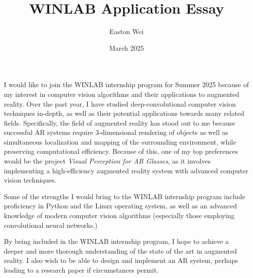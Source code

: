 \documentclass[11pt]{scrartcl}
\begin{document}
\title{WINLAB Application Essay}
\author{Easton Wei}
\date{March 2025}
\maketitle
I would like to join the WINLAB internship program for Summer 2025
because of my interest in computer vision algorithms and their
applications to augmented reality. Over the past year, I
have studied deep-convolutional computer vision techniques in-depth,
as well as their potential applications towards many related fields.
Specifically, the field of augmented reality has stood out to me
because successful AR systems require 3-dimensional rendering of objects
as well as simultaneous localization and mapping of the surrounding environment,
while preserving computational efficiency.
Because of this, one of my top preferences would be the project
\textit{Visual Perception for AR Glasses}, as it involves implementing
a high-efficiency augmented reality system with advanced
computer vision techniques.

Some of the strengths I would bring to the WINLAB internship program
include proficiency in Python and the Linux operating system,
as well as an advanced knowledge of modern computer vision algorithms
(especially those employing convolutional neural networks.)

By being included in the WINLAB internship program,
I hope to achieve a deeper and more thorough understanding of the
state of the art in augmented reality. I also wish to be able
to design and implement an AR system, perhaps leading to a
research paper if circumstances permit.
\end{document}
